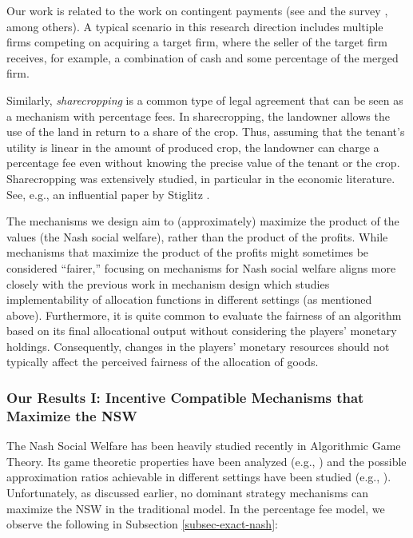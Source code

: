 \documentclass{article}
\begin{document}
Our work is related to the work on contingent payments (see \cite{Hansen85, DM2014} and the survey \cite{S2013}, among others). A typical scenario in this research direction includes multiple firms competing on acquiring a target firm, where the seller of the target firm receives, for example, a combination of cash and some percentage of the merged firm.

Similarly, \emph{sharecropping} is a common type of legal agreement that can be seen as a mechanism with percentage fees. In sharecropping, the landowner allows the use of the land in return to a share of the crop. Thus, assuming that the tenant's utility is linear in the amount of produced crop, the landowner can charge a percentage fee even without knowing the precise value of the tenant or the crop. Sharecropping was extensively studied, in particular in the economic literature. See, e.g., an influential paper by Stiglitz \cite{stiglitz74}.

The mechanisms we design aim to (approximately) maximize the product of the values (the Nash social welfare), rather than the product of the profits. While mechanisms that maximize the product of the profits might sometimes be considered ``fairer,'' focusing on mechanisms for Nash social welfare aligns more closely with the previous work in mechanism design which studies implementability of allocation functions in different settings (as mentioned above). Furthermore, it is quite common to evaluate the fairness of an algorithm based on its final allocational output without considering the players' monetary holdings. Consequently, changes in the players' monetary resources should not typically affect the perceived fairness of the allocation of goods.



\subsubsection*{Our Results I: Incentive Compatible Mechanisms that Maximize the NSW}

The Nash Social Welfare has been heavily studied recently in Algorithmic Game Theory. Its game theoretic properties have been analyzed (e.g., \cite{CKMPSW19}) and the possible approximation ratios achievable in different settings have been studied (e.g., \cite{CV15,AOSS17,BKKV18,LV22}). Unfortunately, as discussed earlier, no dominant strategy mechanisms can maximize the NSW in the traditional model. In the percentage fee model, we observe the following in Subsection \ref{subsec-exact-nash}:
\end{document}
